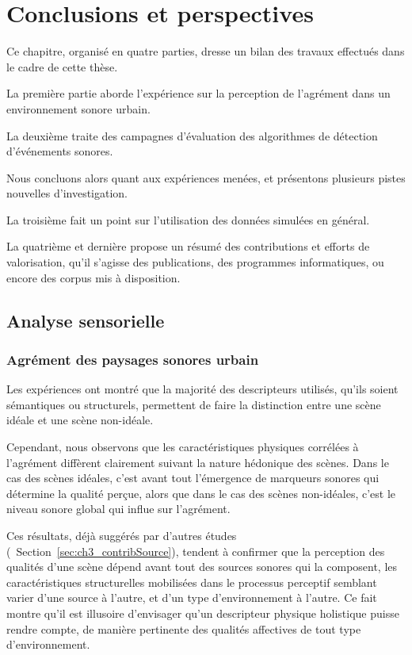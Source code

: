\chapter{Conclusions et perspectives}\label{ch:end_conc}

Ce chapitre, organisé en quatre parties, dresse un bilan des travaux effectués dans le cadre de cette thèse.

La première partie aborde l'expérience sur la perception de l'agrément dans un environnement sonore urbain.

La deuxième traite des campagnes d'évaluation des algorithmes de détection d'événements sonores.

Nous concluons alors quant aux expériences menées, et présentons plusieurs pistes nouvelles d'investigation.

La troisième fait un point sur l'utilisation des données simulées en général.

La quatrième et dernière propose un résumé des contributions et efforts de valorisation, qu'il s'agisse des publications, des programmes informatiques, ou encore des corpus mis à disposition.

\section{Analyse sensorielle}

\subsection{Agrément des paysages sonores urbain}

Les expériences ont montré que la majorité des descripteurs utilisés, qu'ils soient sémantiques ou structurels, permettent de faire la distinction entre une scène idéale et une scène non-idéale.

Cependant, nous observons que les caractéristiques physiques corrélées à l'agrément diffèrent clairement suivant la nature hédonique des scènes. Dans le cas des scènes idéales, c'est avant tout l'émergence de marqueurs sonores qui détermine la qualité perçue, alors que dans le cas des scènes non-idéales, c'est le niveau sonore global qui influe sur l'agrément.

Ces résultats, déjà suggérés par d'autres études (\cf~Section~\ref{sec:ch3_contribSource}), tendent à confirmer que la perception des qualités d'une scène dépend avant tout des sources sonores qui la composent, les caractéristiques structurelles mobilisées dans le processus perceptif semblant varier d'une source à l'autre, et d'un type d'environnement à l'autre. Ce fait montre qu'il est illusoire d'envisager qu'un descripteur physique holistique puisse rendre compte, de manière pertinente des qualités affectives de tout type d'environnement.


